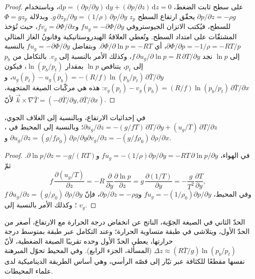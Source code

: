 \begin{proof}
على سطح ثابت الضغط، $\mathrm dp = (\partial p/\partial y)
\,\mathrm dy + (\partial p/\partial z)\,\mathrm dz = 0$، وباستخدام
$\partial p/\partial z = -\rho g$ يحقّق ارتفاع السطح $z_p$
$g\,\partial z_p/\partial y = (1/\rho)\,\partial p/\partial y$. وبدلالة
 $\Phi = gz_p$ للسطح، فيُكتب الاتزان الجيوستروفي
$fu_g = -\partial\Phi/\partial y$ و$fv_g = \partial\Phi/\partial x$، حيث
تُؤخذ المشتقّات على امتداد السطح. وتُعطي العلاقةُ الهيدروستاتيكية
وقانونُ الغاز المثالي $\partial\Phi/\partial p = -1/\rho = -RT/p$، أي
$\partial\Phi/\partial\ln p = -RT$. وبتفاضل $fu_g =
-\partial\Phi/\partial y$ بالنسبة إلى $\ln p$ نجد $f\,\partial
u_g/\partial\ln p = R\,\partial T/\partial y$، وكذلك الأمر بالنسبة إلى $v_g$.
بالتكامل من $p_b$ إلى $p_t$، يتناقص $\ln p$ بمقدار $\ln(p_b/p_t)$، فيكون
$u_g(p_t) - u_g(p_b) = -(R/f)\ln(p_b/p_t)\,\partial\bar T/\partial y$،
و$v_g(p_t) - v_g(p_b) = (R/f)\ln(p_b/p_t)\,\partial\bar T/\partial x$: هذه
هي مركّبات الصيغة المتجهية، لأنّ $\vec k\times\nabla\bar T =
(-\partial\bar T/\partial y, \partial\bar T/\partial x)$.
\end{proof}

\begin{corollary}\label{cor:b3:gfd-foundations:thermal-wind-z}
في إحداثيات الارتفاع، وبالنسبة إلى الغلاف الجوي، $\partial u_g/\partial z =
-(g/fT)\,\partial T/\partial y + (u_g/T)\,\partial T/\partial z$؛ وبالنسبة إلى
المحيط في ، $\partial u_g/\partial z =
(g/f\rho_0)\,\partial\rho/\partial y$ و$\partial v_g/\partial z =
-(g/f\rho_0)\,\partial\rho/\partial x$.
\end{corollary}

\begin{proof}
في الهواء، $fu_g = -(1/\rho)\partial p/\partial y = -RT\,\partial\ln
p/\partial y$ و$\partial\ln p/\partial z = -g/(RT)$. ثمّ
\[
f\,\frac{\partial(u_g/T)}{\partial z} = -R\,\frac{\partial}{\partial y}\frac{\partial\ln p}{\partial z}
= g\,\frac{\partial(1/T)}{\partial y} = -\frac{g}{T^2}\frac{\partial T}{\partial y} ,
\]
وفي المحيط، $fu_g = -(1/\rho_0)\partial
p/\partial y$ و$\partial p/\partial z = -\rho g$، فإنّ $f\,\partial u_g/
\partial z = (g/\rho_0)\,\partial\rho/\partial y$؛ وكذلك الأمر بالنسبة إلى $v_g$.
\end{proof}

الحدّ الثاني في الصيغة الجوّية، الناتج عن انخفاض درجة الحرارة
مع الارتفاع، أصغر من الحدّ الأول، ويتلاشى في طبقة متساوية الحرارة؛
وعند التكامل عبر طبقة بمتوسط درجة حرارتها، يعطي الحدّ الأول وحده
تقريبًا الصيغة الضغطية، لأنّ $\Delta z \approx (R\bar T/g)
\ln(p_b/p_t)$ (المسألة، الجزء الرابع). وفي المحيط تحوّل المبرهنة نفسها
مقطعًا للكثافة عبر تيّار إلى قصّه الرأسي، وهي أساس
الطريقة الديناميكية لدى علماء المحيطات.


